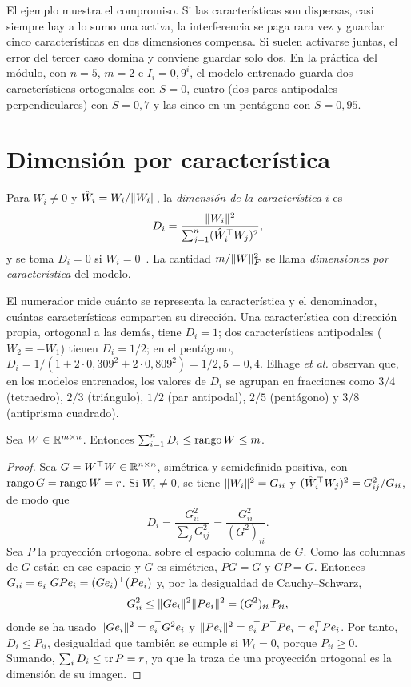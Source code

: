 El ejemplo muestra el compromiso. Si las características son dispersas, casi siempre hay a lo sumo una activa, la interferencia se paga rara vez y guardar cinco características en dos dimensiones compensa. Si suelen activarse juntas, el error del tercer caso domina y conviene guardar solo dos. En la práctica del módulo, con $n=5$, $m=2$ e $I_i=0{,}9^{i}$, el modelo entrenado guarda dos características ortogonales con $S=0$, cuatro (dos pares antipodales perpendiculares) con $S=0{,}7$ y las cinco en un pentágono con $S=0{,}95$.

\section{Dimensión por característica}

\begin{definicion}\label{def:dimension}
Para $W_i\neq 0$ y $\hat W_i=W_i/\lVert W_i\rVert$, la \emph{dimensión de la característica $i$} es
\[
D_i=\frac{\lVert W_i\rVert^{2}}{\sum_{j=1}^{n}(\hat W_i^{\top} W_j)^{2}},
\]
y se toma $D_i=0$ si $W_i=0$~\cite[«Feature Dimensionality»]{elhage22}. La cantidad $m/\lVert W\rVert_F^{2}$ se llama \emph{dimensiones por característica} del modelo.
\end{definicion}

El numerador mide cuánto se representa la característica y el denominador, cuántas características comparten su dirección. Una característica con dirección propia, ortogonal a las demás, tiene $D_i=1$; dos características antipodales ($W_2=-W_1$) tienen $D_i=1/2$; en el pentágono, $D_i=1/(1+2\cdot 0{,}309^{2}+2\cdot 0{,}809^{2})=1/2{,}5=0{,}4$. Elhage \emph{et al.} observan que, en los modelos entrenados, los valores de $D_i$ se agrupan en fracciones como $3/4$ (tetraedro), $2/3$ (triángulo), $1/2$ (par antipodal), $2/5$ (pentágono) y $3/8$ (antiprisma cuadrado).

\begin{proposicion}\label{prop:suma-dim}
Sea $W\in\mathbb{R}^{m\times n}$. Entonces $\sum_{i=1}^{n}D_i\le\operatorname{rango} W\le m$.
\end{proposicion}

\begin{proof}
Sea $G=W^{\top} W\in\mathbb{R}^{n\times n}$, simétrica y semidefinida positiva, con $\operatorname{rango} G=\operatorname{rango} W=r$. Si $W_i\neq 0$, se tiene $\lVert W_i\rVert^{2}=G_{ii}$ y $(\hat W_i^{\top} W_j)^{2}=G_{ij}^{2}/G_{ii}$, de modo que
\[
D_i=\frac{G_{ii}^{2}}{\sum_jG_{ij}^{2}}=\frac{G_{ii}^{2}}{(G^{2})_{ii}}.
\]
Sea $P$ la proyección ortogonal sobre el espacio columna de $G$. Como las columnas de $G$ están en ese espacio y $G$ es simétrica, $PG=G$ y $GP=G$. Entonces $G_{ii}=e_i^{\top} GPe_i=(Ge_i)^{\top}(Pe_i)$ y, por la desigualdad de Cauchy--Schwarz,
\[
G_{ii}^{2}\le\lVert Ge_i\rVert^{2}\lVert Pe_i\rVert^{2}=(G^{2})_{ii}\,P_{ii},
\]
donde se ha usado $\lVert Ge_i\rVert^{2}=e_i^{\top} G^{2}e_i$ y $\lVert Pe_i\rVert^{2}=e_i^{\top} P^{\top} Pe_i=e_i^{\top} Pe_i$. Por tanto, $D_i\le P_{ii}$, desigualdad que también se cumple si $W_i=0$, porque $P_{ii}\ge 0$. Sumando, $\sum_iD_i\le\operatorname{tr} P=r$, ya que la traza de una proyección ortogonal es la dimensión de su imagen.
\end{proof}

